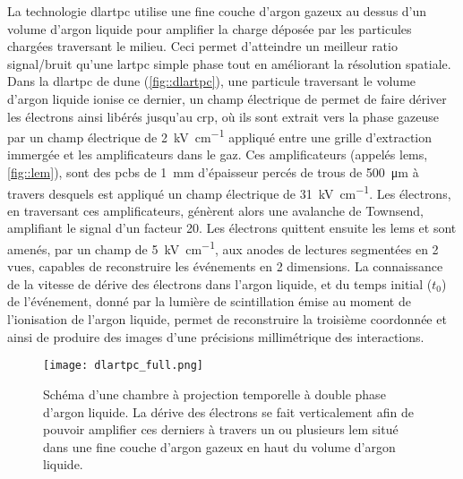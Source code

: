     La technologie \gls{dlartpc} utilise une fine couche d'argon gazeux au dessus d'un volume d'argon liquide pour amplifier la charge déposée par les particules chargées traversant le milieu. Ceci permet d'atteindre un meilleur ratio signal/bruit qu'une \gls{lartpc} simple phase tout en améliorant la résolution spatiale. Dans la \gls{dlartpc} de \gls{dune} (\autoref{fig::dlartpc}), une particule traversant le volume d'argon liquide ionise ce dernier, un champ électrique de \driftfield{} permet de faire dériver les électrons ainsi libérés jusqu'au \gls{crp}, où ils sont extrait vers la phase gazeuse par un champ électrique de \SI{2}{\kilo\volt\per\centi\meter} appliqué entre une grille d'extraction immergée et les amplificateurs dans le gaz. Ces amplificateurs (appelés \glspl{lem}, \autoref{fig::lem}), sont des \glspl{pcb} de \SI{1}{\milli\meter} d'épaisseur percés de trous de \SI{500}{\micro\meter} à travers desquels est appliqué un champ électrique de  \SI{31}{\kilo\volt\per\centi\meter}. Les électrons, en traversant ces amplificateurs, génèrent alors une avalanche de Townsend, amplifiant le signal d'un facteur 20. Les électrons quittent ensuite les \glspl{lem} et sont amenés, par un champ de  \SI{5}{\kilo\volt\per\centi\meter}, aux anodes de lectures segmentées en 2 vues, capables de reconstruire les événements en 2 dimensions. La connaissance de la vitesse de dérive des électrons dans l'argon liquide, et du temps initial ($t_0$) de l'événement, donné par la lumière de scintillation émise au moment de l'ionisation de l'argon liquide, permet de reconstruire la troisième coordonnée et ainsi de produire des images d'une précisions millimétrique des interactions.

    \begin{figure}[htbp]
      \centering
      \texttt{[image: dlartpc\_full.png]}
      \caption[Schéma d'une chambre à projection temporelle à double phase d'argon liquide]{\label{fig::dlartpc}Schéma d'une chambre à projection temporelle à double phase d'argon liquide. La dérive des électrons se fait verticalement afin de pouvoir amplifier ces derniers à travers un ou plusieurs \acrfull{lem} situé dans une fine couche d'argon gazeux en haut du volume d'argon liquide.}
    \end{figure}
    
